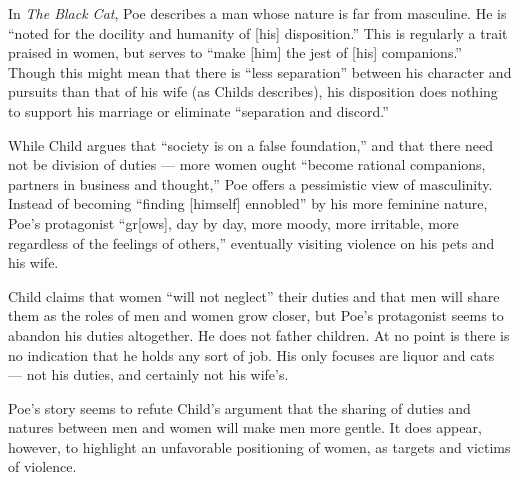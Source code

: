 \documentclass[man,12pt,natbib]{apa6}
\begin{document}
In \emph{The Black Cat}, Poe describes a man whose nature is far from
masculine. He is ``noted for the docility and humanity of [his] disposition.''
This is regularly a trait praised in women, but serves to ``make [him] the jest
of [his] companions.'' Though this might mean that there is ``less separation''
between his character and pursuits than that of his wife (as Childs describes),
his disposition does nothing to support his marriage or eliminate ``separation
and discord.''

While Child argues that ``society is on a false foundation,'' and that there
need not be division of duties --- more women ought ``become rational
companions, partners in business and thought,'' Poe offers a pessimistic view
of masculinity. Instead of becoming ``finding [himself] ennobled'' by his more
feminine nature, Poe's protagonist ``gr[ows], day by day, more moody, more
irritable, more regardless of the feelings of others,'' eventually visiting
violence on his pets and his wife.

Child claims that women ``will not neglect'' their duties and that men will
share them as the roles of men and women grow closer, but Poe's protagonist
seems to abandon his duties altogether.  He does not father children. At no
point is there is no indication that he holds any sort of job. His only focuses
are liquor and cats --- not his duties, and certainly not his wife's.

Poe's story seems to refute Child's argument that the sharing of duties and
natures between men and women will make men more gentle. It does appear,
however, to highlight an unfavorable positioning of women, as targets and
victims of violence.

\nocite{Child12b, Melville12, Poe12b}

\clearpage

\end{document}
